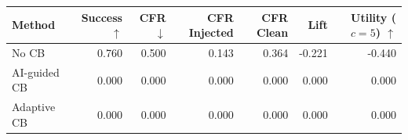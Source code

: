 \begin{tabular}{lrrrrrr}
\toprule
Method & Success $\uparrow$ & CFR $\downarrow$ & CFR Injected & CFR Clean & Lift & Utility ($c=5$) $\uparrow$ \\
\midrule
No CB & 0.760 & 0.500 & 0.143 & 0.364 & -0.221 & -0.440 \\
AI-guided CB & 0.000 & 0.000 & 0.000 & 0.000 & 0.000 & 0.000 \\
Adaptive CB & 0.000 & 0.000 & 0.000 & 0.000 & 0.000 & 0.000 \\
\bottomrule
\end{tabular}
